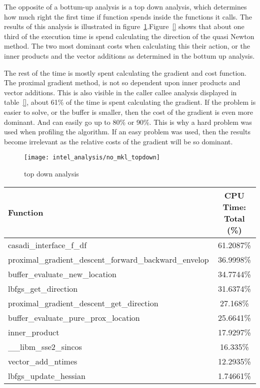 The opposite of a bottum-up  analysis is a top down  analysis, which determines how  much right the first time if function spends inside the functions it calls. The results of this analysis is illustrated in figure~\ref{fig:no mkl top down}.Figure~\ref{} shows that about one third of the execution time is spend calculating the direction of the quasi Newton method. The two most dominant costs when calculating this their action, or the inner products and the vector additions as determined in the bottum up analysis.

The rest of the time is mostly spent calculating the gradient and cost function. The proximal gradient method, is not so dependent upon inner products and vector additions. This is also visible in the caller callee analysis displayed in table~\ref{}, about 61\% of the time is spent calculating the gradient. If the problem is easier to solve, or the buffer is smaller, then the cost of the gradient is even more dominant. And can easily go up to 80\% or 90\%. This is why a hard problem was used when profiling the algorithm. If an easy problem was used, then the results become irrelevant as the relative costs of the gradient will be so dominant.

\begin{figure}[H]
	\centering
	\texttt{[image: intel\_analysis/no\_mkl\_topdown]}
	\caption{top down analysis}
	\label{fig:no mkl top down}
\end{figure}



\begin{center}
	\begin{tabular}{| l | c |}
		\hline
		Function&CPU Time: Total (\%) \\
		\hline
		casadi\_interface\_f\_df&61.2087\% \\
		proximal\_gradient\_descent\_forward\_backward\_envelop&36.9998\% \\
		buffer\_evaluate\_new\_location&34.7744\% \\
		lbfgs\_get\_direction&31.6374\% \\
		proximal\_gradient\_descent\_get\_direction&27.168\% \\
		buffer\_evaluate\_pure\_prox\_location&25.6641\% \\
		inner\_product&17.9297\% \\
		\_\_libm\_sse2\_sincos&16.335\% \\
		vector\_add\_ntimes&12.2935\% \\
		lbfgs\_update\_hessian&1.74661\% \\
		\hline
	\end{tabular}
\end{center}

